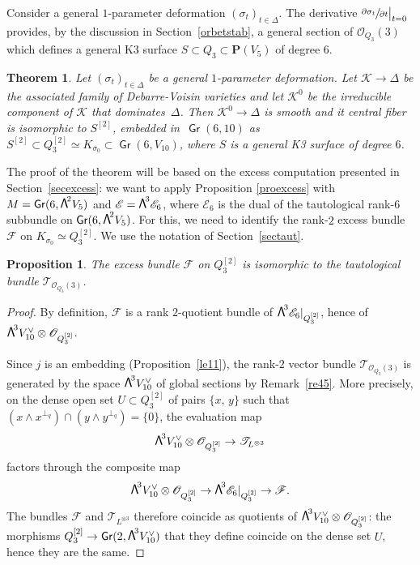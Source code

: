 \documentclass[JEP,XML,SOM,Unicode, NoEqCountersInSection,NoFloatCountersInSection]{cedram}
\let\mathcal\mathscr
\newtheorem{theo}[lemm]{Theorem}
\newtheorem{prop}[lemm]{Proposition}
\theoremstyle{definition}
\renewcommand\P{{\mathbf P}}\let\PP\P
\newcommand\cE{\mathcal{E}}
\newcommand\cF{\mathcal{F}}
\newcommand\cK{\mathcal{K}}
\newcommand\cO{\mathcal{O}}\let\OO\cO
\newcommand\cT{\mathcal{T}}
\DeclareMathOperator{\Gr}{\mathsf{Gr}}
\let\isom\simeq
\let\dual\vee
\newcommand\bw[1]{{\hbox{\large$\mathsf{\Lambda}$}^{\!#1}}}
\newcommand\Qtrois{{Q_3}}
\newcommand\hilb{{Q_3^{[2]}}}
\newcommand\hilbS{S^{[2]}}
\begin{document}
Consider a general $1$-parameter deformation $(\sigma_t)_{t\in \Delta}$. The
derivative $ \sfrac{\partial\sigma_t}{\partial t}\big\vert_{t=0}$ provides, by the discussion in Section~\ref{orbetstab}, a general section of
$\cO_{\Qtrois}(3)$
which defines a general
K3 surface $S\subset \Qtrois\subset \P(V_5)$ of degree 6.

\begin{theo}\label{theoprecis}
Let $(\sigma_t)_{t\in \Delta}$ be a general $1$-parameter deformation.
Let $\cK\to\Delta$ be the associated family of Debarre-Voisin varieties and let $\cK^0$ be the irreducible component of $\cK$ that dominates~$\Delta$.
Then $\cK^0\to \Delta$
is smooth and it central fiber is isomorphic to $\hilbS$, embedded in~$\Gr(6,10)$ as $\hilbS\subset Q_3^{[2]}\isom K_{\sigma_0}\subset \Gr(6,V_{10})$, where
$S$ is a general K3 surface of degree $6$.
\end{theo}

The proof of the theorem will be based on the excess computation presented in Section~\ref{secexcess}: we want to
apply Proposition \ref{proexcess} with $M=\Gr (6,\bw2 V_5)$ and $\cE=\bw3 \cE_6$, where $\cE_6$ is the dual of the tautological rank-6 subbundle on $\Gr (6,\bw2 V_5)$.
For this, we need to identify the rank-$2$ excess bundle~$\cF$ on $K_{\sigma_0}\isom\hilb$. We use the notation of Section~\ref{sectaut}.

\begin{prop}\label{Festtauto3}
The excess bundle $\cF$ on $\hilb$ is isomorphic to the tautological
bundle $\cT_{\cO_{\Qtrois}(3)}$.
\end{prop}

\begin{proof}
By definition, $\cF$ is a rank $2$-quotient bundle of $\bw3\cE_6\vert_{ \hilb}$, hence of \hbox{$\bw3V_{10}^\vee\otimes \cO_{\hilb}$}.

Since $j$ is an embedding (Proposition~\ref{le11}), the rank-$2$ vector bundle $\cT_{\cO_{\Qtrois}(3)}$ is generated by the space
$
\bw3 V_{10}^\vee$ of global sections by Remark~\ref{re45}. More precisely, on the dense open set $U\subset \hilb$ of pairs
$\{x,\,y\}$ such that $(x\wedge x^{\perp_q} )\cap( y\wedge y^{\perp_q})=\{0\}$, the evaluation map
\begin{equation}\label{eq17}
\bw3V_{10}^\vee\otimes \cO_{Q_3^{[2]}}\to \cT_{L^{\otimes 3}}
\end{equation}
factors through the composite map
\begin{equation}\label{eq18}
\bw3V_{10}^\vee\otimes \cO_{\hilb}\to \bw3\cE_6\vert_{ \hilb}\to \cF.
\end{equation}
The bundles $\cF$ and $\cT_{L^{\otimes 3}}$ therefore coincide as quotients of $\bw3V_{10}^\vee\otimes \cO_{Q_3^{[2]}}$: the morphisms $\hilb\to \Gr(2,\bw3 V_{10}^\dual)$ that they define coincide on the dense set $U$, hence they are the same.
\end{proof}
\end{document}
